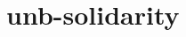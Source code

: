 \chapter{unb-\/solidarity}
\hypertarget{md__r_e_a_d_m_e}{}\label{md__r_e_a_d_m_e}
\label{md__r_e_a_d_m_e_autotoc_md0}%
%

